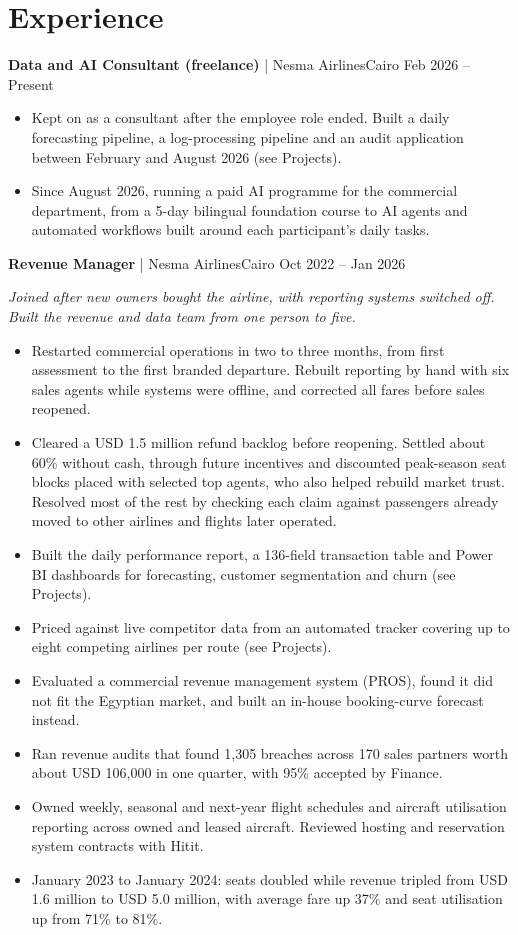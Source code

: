 \documentclass[10pt,a4paper]{article}
\newcommand{\role}[3]{\vspace{5pt}\needspace{3\baselineskip}\textbf{#1}\,\,|\,\,#2\hfill{\small\color{muted}#3}\par}
\newcommand{\rolenote}[1]{{\small\itshape\color{muted}#1}\par}
\begin{document}
\section{Experience}
\role{Data and AI Consultant (freelance)}{Nesma Airlines}{Cairo \textperiodcentered{} Feb 2026 -- Present}
\begin{itemize}
  \item Kept on as a consultant after the employee role ended. Built a daily forecasting pipeline, a log-processing pipeline and an audit application between February and August 2026 (see Projects).
  \item Since August 2026, running a paid AI programme for the commercial department, from a 5-day bilingual foundation course to AI agents and automated workflows built around each participant's daily tasks.
\end{itemize}

\role{Revenue Manager}{Nesma Airlines}{Cairo \textperiodcentered{} Oct 2022 -- Jan 2026}
\rolenote{Joined after new owners bought the airline, with reporting systems switched off. Built the revenue and data team from one person to five.}
\begin{itemize}
  \item Restarted commercial operations in two to three months, from first assessment to the first branded departure. Rebuilt reporting by hand with six sales agents while systems were offline, and corrected all fares before sales reopened.
  \item Cleared a USD 1.5 million refund backlog before reopening. Settled about 60\% without cash, through future incentives and discounted peak-season seat blocks placed with selected top agents, who also helped rebuild market trust. Resolved most of the rest by checking each claim against passengers already moved to other airlines and flights later operated.
  \item Built the daily performance report, a 136-field transaction table and Power BI dashboards for forecasting, customer segmentation and churn (see Projects).
  \item Priced against live competitor data from an automated tracker covering up to eight competing airlines per route (see Projects).
  \item Evaluated a commercial revenue management system (PROS), found it did not fit the Egyptian market, and built an in-house booking-curve forecast instead.
  \item Ran revenue audits that found 1,305 breaches across 170 sales partners worth about USD 106,000 in one quarter, with 95\% accepted by Finance.
  \item Owned weekly, seasonal and next-year flight schedules and aircraft utilisation reporting across owned and leased aircraft. Reviewed hosting and reservation system contracts with Hitit.
  \item January 2023 to January 2024: seats doubled while revenue tripled from USD 1.6 million to USD 5.0 million, with average fare up 37\% and seat utilisation up from 71\% to 81\%.
\end{itemize}
\end{document}
